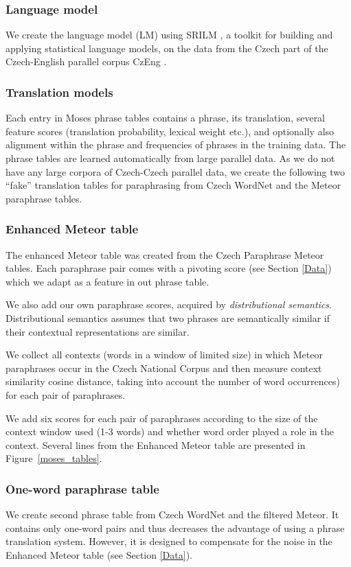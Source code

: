 \documentclass[11pt]{article}
\def\Fref#1{Figure~\ref{#1}}
\begin{document}
\subsubsection{Language model}
We create the language model (LM) using SRILM  \cite{srilm}, a toolkit for 
building and applying statistical language models, on the data from the Czech 
part of the Czech-English parallel corpus CzEng \cite{czeng}. 

\subsubsection{Translation models}
Each entry in Moses phrase tables contains a phrase, its translation, several
feature scores (translation probability, lexical weight etc.), and optionally
also alignment within the phrase and frequencies of phrases in the training 
data. The phrase tables are learned automatically from large parallel data.
As we do not have any large corpora of Czech-Czech parallel data, we create the 
following two ``fake'' translation tables for paraphrasing from Czech WordNet
and the Meteor paraphrase tables.

\subsubsection*{Enhanced Meteor table}
The enhanced Meteor table was created from the Czech Paraphrase Meteor tables. Each 
paraphrase pair comes with a pivoting score (see Section \ref{Data}) which we 
adapt as a feature in out phrase table. 

We also add our own paraphrase scores, acquired by \textit{distributional 
semantics}. Distributional semantics assumes that two phrases are semantically 
similar if their contextual representations are similar. \cite{miller-91}

We collect all contexts (words in a window of limited size) in which Meteor 
paraphrases occur in the Czech National Corpus \cite{SYN2010} and then measure 
context similarity cosine distance, taking into account the number of word 
occurrences) for each pair of paraphrases. 

We add six scores for each pair of paraphrases according to the size of the 
context window used (1-3 words) and whether word order played a role in the 
context. Several lines from the Enhanced Meteor table are presented in 
\Fref{moses_tables}.

\subsubsection*{One-word paraphrase table}
We create second phrase table from Czech WordNet and the filtered Meteor.
It contains only one-word pairs and thus decreases the advantage of using
a phrase translation system. However, it is designed to compensate for
the noise in the Enhanced Meteor table (see Section \ref{Data}).
\end{document}
